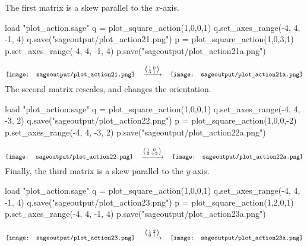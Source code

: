 The first matrix is a skew parallel to the $x$-axis.
\begin{sageoutput}[d,0,4;d,5,7]
load "plot_action.sage"
q = plot_square_action(1,0,0,1) 
q.set_axes_range(-4, 4, -1, 4) 
q.save("sageoutput/plot_action21.png")
p = plot_square_action(1,0,3,1) 
p.set_axes_range(-4, 4, -1, 4) 
p.save("sageoutput/plot_action21a.png")
\end{sageoutput}
\begin{equation*}
  \vcenteredhbox{\texttt{[image: sageoutput/plot\_action21.png]}}
  \quad\mapsvia{\big (\begin{smallmatrix} 1 &0 \\ 3 &1 \end{smallmatrix}\big )}\quad
  \vcenteredhbox{\texttt{[image: sageoutput/plot\_action21a.png]}}
\end{equation*}
\noindent
The second matrix rescales, and changes the orientation.
\begin{sageoutput}[d,0,4;d,5,7]
load "plot_action.sage"
q = plot_square_action(1,0,0,1) 
q.set_axes_range(-4, 4, -3, 2) 
q.save("sageoutput/plot_action22.png")
p = plot_square_action(1,0,0,-2) 
p.set_axes_range(-4, 4, -3, 2) 
p.save("sageoutput/plot_action22a.png")
\end{sageoutput}
\begin{equation*}
  \vcenteredhbox{\texttt{[image: sageoutput/plot\_action22.png]}}
  \quad\mapsvia{\big (\begin{smallmatrix} 1 &0 \\ 0 &-2 \end{smallmatrix}\big )}\quad
  \vcenteredhbox{\texttt{[image: sageoutput/plot\_action22a.png]}}
\end{equation*}
\noindent
Finally, the third matrix is a skew parallel to the $y$-axis.
\begin{sageoutput}[d,0,4;d,5,7]
load "plot_action.sage"
q = plot_square_action(1,0,0,1) 
q.set_axes_range(-4, 4, -1, 4) 
q.save("sageoutput/plot_action23.png")
p = plot_square_action(1,2,0,1) 
p.set_axes_range(-4, 4, -1, 4) 
p.save("sageoutput/plot_action23a.png")
\end{sageoutput}
\begin{equation*}
  \vcenteredhbox{\texttt{[image: sageoutput/plot\_action23.png]}}
  \quad\mapsvia{\big (\begin{smallmatrix} 1 &2 \\ 0 &1 \end{smallmatrix}\big )}\quad
  \vcenteredhbox{\texttt{[image: sageoutput/plot\_action23a.png]}}
\end{equation*}
  
